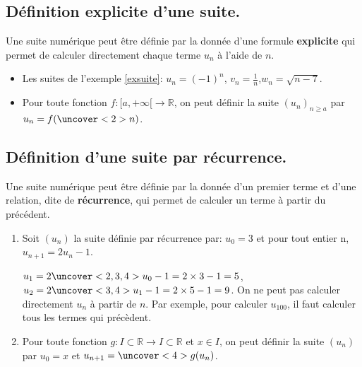 \documentclass{beamer}
\begin{document}
  \subsection{Définition explicite d'une suite.} 
    
  \begin{frame}
  \begin{definition}
  Une suite numérique peut être définie par la donnée d'une formule 
  \textbf{explicite}
  qui permet de calculer directement chaque terme $u_n$ à l'aide de $n$.
  \end{definition}
  \end{frame}
  
  \begin{frame}
   \begin{example}
   \begin{itemize}
    \item Les suites de l'exemple \ref{exsuite}: $u_n=(-1)^n$, $v_n=\frac{1}{n}$,$w_n=\sqrt{n-7}$.
    \item Pour toute fonction $f:[a,+\infty[ \to \mathbb{R}$, on peut définir la suite
   $(u_n)_{n \geq a}$ par $u_n=f(\uncover<2>{n})$. 
   \end{itemize}

  \end{example}
  \end{frame}
  
  \subsection{Définition d'une suite par récurrence.}
  
  \begin{frame}
   \begin{theorem}
      Une suite numérique peut être définie par la donnée d'un premier terme
      et d'une relation, dite de \textbf{récurrence}, qui permet de calculer 
      un terme à partir du précédent.
   \end{theorem}
  \end{frame}
  
  \begin{frame}
    \begin{example}
    \begin{enumerate}
    \item
    Soit $(u_n)$ la suite définie par récurrence par: $u_0=3$ et pour tout entier n, $u_{n+1}=2u_n-1$.

  $u_1=2\uncover<2,3,4> {u_0}-1=2 \times 3-1=5$, $u_2=2 \uncover<3,4>{u_1}-1=2 \times 5-1=9$. On ne peut pas calculer
  directement $u_n$ à partir de $n$. Par exemple, pour calculer $u_{100}$, il 
  faut calculer tous les termes qui précèdent.
  
  \item Pour toute fonction $g:I \subset \mathbb{R}
  \to I \subset \mathbb{R}$ et $x \in I$, on peut définir la suite $(u_n)$ par $u_0= x$ et 
  $u_{n+1}=\uncover<4>{g}(u_n)$.
  \end{enumerate}
  
   \end{example}
  \end{frame}
  
\end{document}
